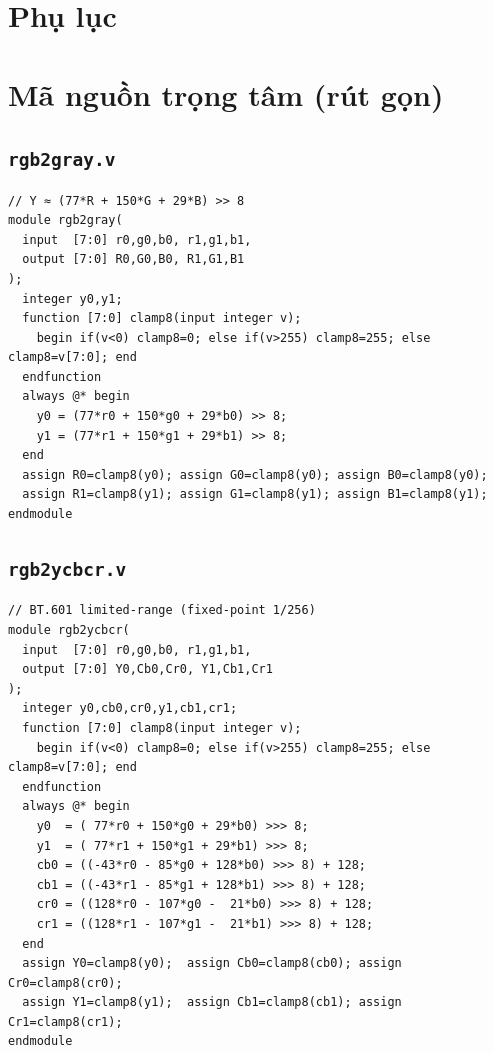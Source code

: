 \appendix
\section*{Phụ lục}

\section{Mã nguồn trọng tâm (rút gọn)}

\subsection{\texttt{rgb2gray.v}}
\begin{lstlisting}[style=vncode]
// Y ≈ (77*R + 150*G + 29*B) >> 8
module rgb2gray(
  input  [7:0] r0,g0,b0, r1,g1,b1,
  output [7:0] R0,G0,B0, R1,G1,B1
);
  integer y0,y1;
  function [7:0] clamp8(input integer v);
    begin if(v<0) clamp8=0; else if(v>255) clamp8=255; else clamp8=v[7:0]; end
  endfunction
  always @* begin
    y0 = (77*r0 + 150*g0 + 29*b0) >> 8;
    y1 = (77*r1 + 150*g1 + 29*b1) >> 8;
  end
  assign R0=clamp8(y0); assign G0=clamp8(y0); assign B0=clamp8(y0);
  assign R1=clamp8(y1); assign G1=clamp8(y1); assign B1=clamp8(y1);
endmodule
\end{lstlisting}

\subsection{\texttt{rgb2ycbcr.v}}
\begin{lstlisting}[style=vncode]
// BT.601 limited-range (fixed-point 1/256)
module rgb2ycbcr(
  input  [7:0] r0,g0,b0, r1,g1,b1,
  output [7:0] Y0,Cb0,Cr0, Y1,Cb1,Cr1
);
  integer y0,cb0,cr0,y1,cb1,cr1;
  function [7:0] clamp8(input integer v);
    begin if(v<0) clamp8=0; else if(v>255) clamp8=255; else clamp8=v[7:0]; end
  endfunction
  always @* begin
    y0  = ( 77*r0 + 150*g0 + 29*b0) >>> 8;
    y1  = ( 77*r1 + 150*g1 + 29*b1) >>> 8;
    cb0 = ((-43*r0 - 85*g0 + 128*b0) >>> 8) + 128;
    cb1 = ((-43*r1 - 85*g1 + 128*b1) >>> 8) + 128;
    cr0 = ((128*r0 - 107*g0 -  21*b0) >>> 8) + 128;
    cr1 = ((128*r1 - 107*g1 -  21*b1) >>> 8) + 128;
  end
  assign Y0=clamp8(y0);  assign Cb0=clamp8(cb0); assign Cr0=clamp8(cr0);
  assign Y1=clamp8(y1);  assign Cb1=clamp8(cb1); assign Cr1=clamp8(cr1);
endmodule
\end{lstlisting}

